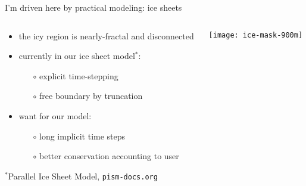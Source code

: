 \documentclass{beamer}
\begin{document}
\begin{frame}{I'm driven here by practical modeling: ice sheets}

\begin{columns}
\begin{column}{0.5\textwidth}
\begin{itemize}
\small
\item the icy region is nearly-fractal and disconnected
\item currently in our ice sheet model$^*$:
  \begin{itemize}
  \item[$\circ$] explicit time-stepping
  \item[$\circ$] free boundary by truncation
  \end{itemize}
\item want for our model:
  \begin{itemize}
  \item[$\circ$] long implicit time steps
  \item[$\circ$] better conservation accounting to user
  \end{itemize}
\end{itemize}

\vspace{10mm}
{\scriptsize $^*$Parallel Ice Sheet Model, \texttt{pism-docs.org}}
\end{column}
\begin{column}{0.5\textwidth}
\vspace{-5mm}

\begin{center}
\texttt{[image: ice-mask-900m]}
\end{center}
\end{column}
\end{columns}
\end{frame}
\end{document}
